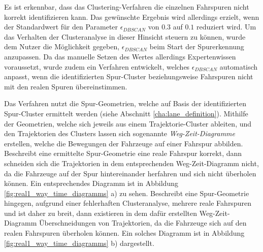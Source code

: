 Es ist erkennbar, dass das Clustering-Verfahren die einzelnen Fahrspuren nicht korrekt identifizieren
kann. Das gewünschte Ergebnis wird allerdings erzielt, wenn der Standardwert für den Parameter $\epsilon_{DBSCAN}$
von $0.3$ auf $0.1$ reduziert wird. Um das Verhalten der Clusteranalyse in dieser Hinsicht steuern zu können,
wurde dem Nutzer die Möglichkeit gegeben, $\epsilon_{DBSCAN}$ beim Start der Spurerkennung anzupassen.
Da das manuelle Setzen des Wertes allerdings Expertenwissen voraussetzt, wurde zudem ein Verfahren entwickelt,
welches $\epsilon_{DBSCAN}$ automatisch anpasst, wenn die identifizierten Spur-Cluster beziehungsweise Fahrspuren
nicht mit den realen Spuren übereinstimmen.

Das Verfahren nutzt die Spur-Geometrien, welche auf Basis
der identifizierten Spur-Cluster ermittelt werden (siehe Abschnitt \ref{cha:lane_definition}).
Mithilfe der Geometrien, welche sich jeweils aus einem Trajektorie-Cluster ableiten, und den Trajektorien des
Clusters lassen sich sogenannte \textit{Weg-Zeit-Diagramme} erstellen, welche die Bewegungen der Fahrzeuge auf einer
Fahrspur abbilden.
Beschreibt eine ermittelte Spur-Geometrie eine reale Fahrspur korrekt, dann schneiden sich die Trajektorien
in dem entsprechenden Weg-Zeit-Diagramm nicht, da die Fahrzeuge auf der Spur hintereinander herfahren
und sich nicht überholen können. Ein entsprechendes Diagramm ist in Abbildung \ref{fig:real1_way_time_diagramms} a) zu sehen.
Beschreibt eine Spur-Geometrie hingegen, aufgrund einer fehlerhaften Clusteranalyse, mehrere reale Fahrspuren
und ist daher zu breit, dann existieren in dem dafür erstellten Weg-Zeit-Diagramm Überschneidungen von Trajektorien,
da die Fahrzeuge sich auf den realen Fahrspuren überholen können. Ein solches Diagramm ist in
Abbildung \ref{fig:real1_way_time_diagramms} b) dargestellt.

